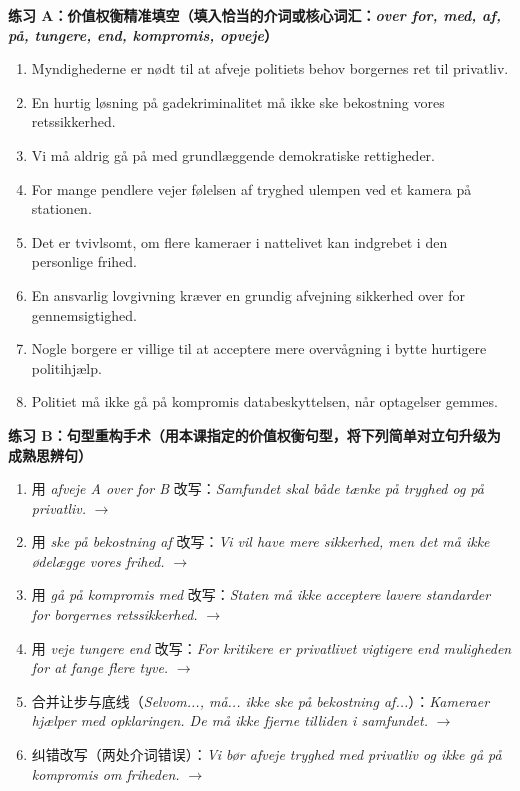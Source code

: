 \textbf{练习 A：价值权衡精准填空（填入恰当的介词或核心词汇：\textit{over for, med, af, på, tungere, end, kompromis, opveje}）}
\begin{enumerate}
  \item Myndighederne er nødt til at afveje politiets behov \underline{\hspace{2.2cm}} borgernes ret til privatliv.
  \item En hurtig løsning på gadekriminalitet må ikke ske \underline{\hspace{2.2cm}} bekostning \underline{\hspace{2.2cm}} vores retssikkerhed.
  \item Vi må aldrig gå på \underline{\hspace{2.2cm}} med grundlæggende demokratiske rettigheder.
  \item For mange pendlere vejer følelsen af tryghed \underline{\hspace{2.2cm}} \underline{\hspace{2.2cm}} ulempen ved et kamera på stationen.
  \item Det er tvivlsomt, om flere kameraer i nattelivet kan \underline{\hspace{2.2cm}} indgrebet i den personlige frihed.
  \item En ansvarlig lovgivning kræver en grundig afvejning \underline{\hspace{2.2cm}} sikkerhed over for gennemsigtighed.
  \item Nogle borgere er villige til at acceptere mere overvågning i bytte \underline{\hspace{2.2cm}} hurtigere politihjælp.
  \item Politiet må ikke gå på kompromis \underline{\hspace{2.2cm}} databeskyttelsen, når optagelser gemmes.
\end{enumerate}

\textbf{练习 B：句型重构手术（用本课指定的价值权衡句型，将下列简单对立句升级为成熟思辨句）}
\begin{enumerate}
  \item 用 \textit{afveje A over for B} 改写：\textit{Samfundet skal både tænke på tryghed og på privatliv.} $\rightarrow$
  \item 用 \textit{ske på bekostning af} 改写：\textit{Vi vil have mere sikkerhed, men det må ikke ødelægge vores frihed.} $\rightarrow$
  \item 用 \textit{gå på kompromis med} 改写：\textit{Staten må ikke acceptere lavere standarder for borgernes retssikkerhed.} $\rightarrow$
  \item 用 \textit{veje tungere end} 改写：\textit{For kritikere er privatlivet vigtigere end muligheden for at fange flere tyve.} $\rightarrow$
  \item 合并让步与底线（\textit{Selvom..., må... ikke ske på bekostning af...}）：\textit{Kameraer hjælper med opklaringen. De må ikke fjerne tilliden i samfundet.} $\rightarrow$
  \item 纠错改写（两处介词错误）：\textit{Vi bør afveje tryghed med privatliv og ikke gå på kompromis om friheden.} $\rightarrow$
\end{enumerate}

